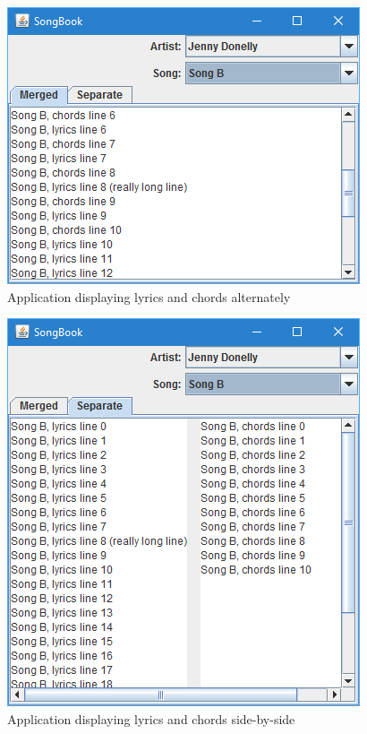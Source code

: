 \documentclass[titlepage]{article}
\begin{document}
\begin{figure}
\centering
\includegraphics{img1}
\caption{Application displaying lyrics and chords alternately}
\label{img:merged}
\end{figure}

\begin{figure}
\centering
\includegraphics{img2}
\caption{Application displaying lyrics and chords side-by-side}
\label{img:separate}
\end{figure}
\end{document}
